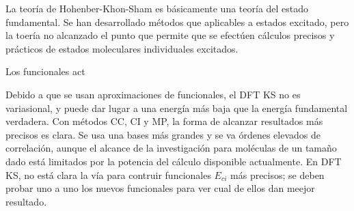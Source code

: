 La teor\'ia de Hohenber-Khon-Sham es b\'asicamente una teor\'ia del
estado fundamental. Se han desarrollado m\'etodos que aplicables a 
estados excitado, pero la toer\'ia no alcanzado el punto que permite
que se efect\'uen c\'alculos precisos y pr\'acticos de estados 
moleculares individuales excitados. 

Los funcionales act

Debido a que se usan aproximaciones de funcionales, el DFT KS no es
variasional, y puede dar lugar a una energ\'ia m\'as baja que la 
energ\'ia fundamental verdadera. Con m\'etodos CC, CI y MP, la forma
de alcanzar resultados m\'as precisos es clara. Se usa una bases 
m\'as grandes y se va \'ordenes elevados de correlaci\'on, aunque el
alcance de la investigaci\'on para mol\'eculas de un tama\~no dado
est\'a limitados por la potencia del c\'alculo disponible 
actualmente. En DFT KS, no est\'a clara la v\'ia para contruir
funcionales $E_{ci}$ m\'as precisos; se deben probar uno a uno los
nuevos funcionales para ver cual de ellos dan meejor resultado.


